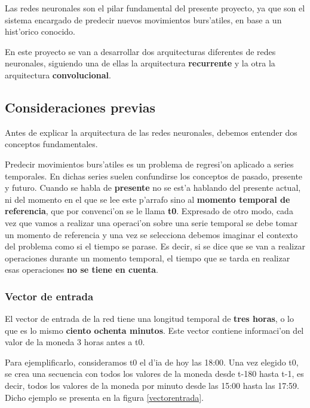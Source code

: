 Las redes neuronales son el pilar fundamental del presente proyecto, ya que son el sistema encargado de predecir nuevos movimientos burs'atiles, en base a un hist'orico conocido. 

En este proyecto se van a desarrollar dos arquitecturas diferentes de redes neuronales, siguiendo una de ellas la arquitectura \textbf{recurrente} y la otra la arquitectura \textbf{convolucional}.



\subsection{Consideraciones previas}

Antes de explicar la arquitectura de las redes neuronales, debemos entender dos conceptos fundamentales. 

Predecir movimientos burs'atiles es un problema de regresi'on aplicado a series temporales. En dichas series suelen confundirse los conceptos de pasado, presente y futuro. Cuando se habla de \textbf{presente} no se est'a hablando del presente actual, ni del momento en el que se lee este p'arrafo sino al \textbf{momento temporal de referencia}, que por convenci'on se le llama \textbf{t0}.
Expresado de otro modo, cada vez que vamos a realizar una operaci'on sobre una serie temporal se debe tomar un momento de referencia y una vez se selecciona debemos imaginar el contexto del problema como si el tiempo se parase. Es decir, si se dice que se van a realizar operaciones durante un momento temporal, el tiempo que se tarda en realizar esas operaciones \textbf{no se tiene en cuenta}.




\subsubsection*{Vector de entrada}
El vector de entrada de la red tiene una longitud temporal de \textbf{tres horas}, o lo que es lo mismo \textbf{ciento ochenta minutos}. Este vector contiene informaci'on del valor de la moneda 3 horas antes a t0.

Para ejemplificarlo, consideramos t0 el d'ia de hoy las 18:00. Una vez elegido t0, se crea una secuencia con todos los valores de la moneda desde t-180 hasta t-1, es decir, todos los valores de la moneda por minuto desde las 15:00 hasta las 17:59.
Dicho ejemplo se presenta en la figura \ref{vectorentrada}.


